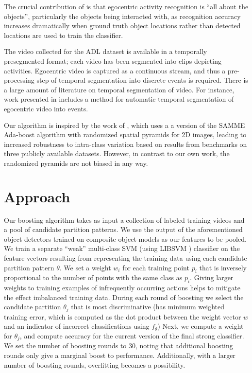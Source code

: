 \documentclass{bmvc2k}
\begin{document}
	The crucial contribution of
	\cite{Ramanan12} is that egocentric activity recognition is ``all about
	the objects'', particularly the objects being interacted with, as
	recognition accuracy increases dramatically when ground truth object
	locations rather than detected locations are used to train the classifier. 

	The video collected for the ADL dataset is available in a temporally
	presegmented format; each video has been segmented into clips depicting
	activities. Egocentric video is captured as a continuous stream, and thus
  a pre-processing step of temporal segmentation into discrete events is
  required. There is a large amount of literature on temporal segmentation
  of video. For instance, work presented in \cite{Lee12} includes a method for
	automatic temporal segmentation of egocentric video into events.
  
	Our algorithm is inspired by the work of \cite{Jiang12}, which uses a
  a version of the SAMME Ada-boost algorithm \cite{Zhu06}
  with randomized spatial pyramids for 2D images, 
	leading to increased robustness to intra-class variation based on results
  from benchmarks on three publicly available datasets. However, in contrast
  to our own work, the randomized pyramids are not biased in any way. 
	

\section{Approach}

	Our boosting algorithm takes as input a collection of labeled training videos
	and a pool of candidate partition patterns. We use the output of the
  aforementioned object detectors trained on composite object models as our features to be
  pooled.
  We train a separate ``weak''
  multi-class SVM 
  (using LIBSVM \cite{Chang11})
	classifier on the feature vectors resulting from representing the training
	data using each candidate partition pattern $\theta$. We set a weight
  $w_i$ for each
	training point $p_i$ that is inversely proportional to the number of points
	with the same class as $p_i$. Giving larger weights to training examples of
  infrequently occurring actions helps to mitigate the effect imbalanced
  training data.
  During each round of boosting we select the
	candidate partition $\theta_j$ that is most discriminative (has minimum
  weighted training
	error, which is computed as the dot product between the weight vector $w$
  and an indicator of incorrect classifications using $f_\theta$)
  Next, we compute a weight for $\theta_j$, and compute accuracy for the
	current version of the final strong classifier. 
	We set the number of boosting rounds to 30, noting that additional boosting
	rounds only give a marginal boost to performance. Additionally, with a
	larger number of boosting rounds, overfitting becomes a possibility.\\
\end{document}
